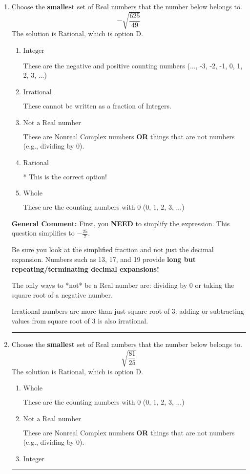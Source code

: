 \documentclass{extbook}[14pt]
\newcommand{\litem}[1]{\item #1

\rule{\textwidth}{0.4pt}}
\begin{document}
\begin{enumerate}\litem{
Choose the \textbf{smallest} set of Real numbers that the number below belongs to.
\[ -\sqrt{\frac{625}{49}} \]The solution is \( \text{Rational} \), which is option D.\begin{enumerate}[label=\Alph*.]
\item \( \text{Integer} \)

These are the negative and positive counting numbers (..., -3, -2, -1, 0, 1, 2, 3, ...)
\item \( \text{Irrational} \)

These cannot be written as a fraction of Integers.
\item \( \text{Not a Real number} \)

These are Nonreal Complex numbers \textbf{OR} things that are not numbers (e.g., dividing by 0).
\item \( \text{Rational} \)

* This is the correct option!
\item \( \text{Whole} \)

These are the counting numbers with 0 (0, 1, 2, 3, ...)
\end{enumerate}

\textbf{General Comment:} First, you \textbf{NEED} to simplify the expression. This question simplifies to $-\frac{25}{7}$. 
 
 Be sure you look at the simplified fraction and not just the decimal expansion. Numbers such as 13, 17, and 19 provide \textbf{long but repeating/terminating decimal expansions!} 
 
 The only ways to *not* be a Real number are: dividing by 0 or taking the square root of a negative number. 
 
 Irrational numbers are more than just square root of 3: adding or subtracting values from square root of 3 is also irrational.
}
\litem{
Choose the \textbf{smallest} set of Real numbers that the number below belongs to.
\[ \sqrt{\frac{81}{25}} \]The solution is \( \text{Rational} \), which is option D.\begin{enumerate}[label=\Alph*.]
\item \( \text{Whole} \)

These are the counting numbers with 0 (0, 1, 2, 3, ...)
\item \( \text{Not a Real number} \)

These are Nonreal Complex numbers \textbf{OR} things that are not numbers (e.g., dividing by 0).
\item \( \text{Integer} \)


\end{enumerate}}
\end{enumerate}
\end{document}

